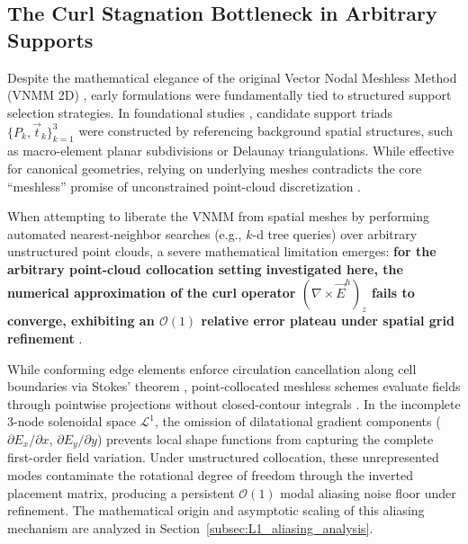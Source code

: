 \documentclass[preprint,12pt]{elsarticle}
\begin{document}
\subsection{The Curl Stagnation Bottleneck in Arbitrary Supports}
\label{subsec:curl_stagnation_bottleneck}

Despite the mathematical elegance of the original Vector Nodal Meshless Method (VNMM 2D) \cite{ortiz2021nodal, ortiz2023tese}, early formulations were fundamentally tied to structured support selection strategies. In foundational studies \cite{ortiz2021nodal, ortiz2023tese, goncalves2023vector}, candidate support triads $\{P_k, \vec{t}_k\}_{k=1}^3$ were constructed by referencing background spatial structures, such as macro-element planar subdivisions or Delaunay triangulations. While effective for canonical geometries, relying on underlying meshes contradicts the core ``meshless'' promise of unconstrained point-cloud discretization \cite{liu2009mesh, goncalves2025tese}.

When attempting to liberate the VNMM from spatial meshes by performing automated nearest-neighbor searches (e.g., $k$-d tree queries) over arbitrary unstructured point clouds, a severe mathematical limitation emerges: \textbf{for the arbitrary point-cloud collocation setting investigated here, the numerical approximation of the curl operator $(\nabla \times \vec{E}^h)_z$ fails to converge, exhibiting an $\mathcal{O}(1)$ relative error plateau under spatial grid refinement} \cite{goncalves2025tese}.

While conforming edge elements enforce circulation cancellation along cell boundaries via Stokes' theorem \cite{nedelec1980mixed, monk2003finite}, point-collocated meshless schemes evaluate fields through pointwise projections without closed-contour integrals \cite{goncalves2025tese}. In the incomplete 3-node solenoidal space $\mathcal{L}^1$, the omission of dilatational gradient components ($\partial E_x/\partial x$, $\partial E_y/\partial y$) prevents local shape functions from capturing the complete first-order field variation. Under unstructured collocation, these unrepresented modes contaminate the rotational degree of freedom through the inverted placement matrix, producing a persistent $\mathcal{O}(1)$ modal aliasing noise floor under refinement. The mathematical origin and asymptotic scaling of this aliasing mechanism are analyzed in Section~\ref{subsec:L1_aliasing_analysis}.
\end{document}
